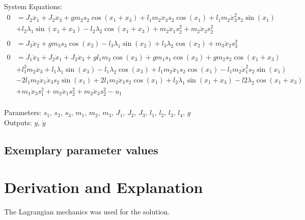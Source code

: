 \documentclass[10pt,a4paper]{article}
\begin{document}
	\noindent System Equations:			
	\begin{subequations}
	\begin{align*}
	0 &= J_2\ddot{x}_1 + J_2\ddot{x}_3 + g m_2 s_2\cos(x_1 + x_3) + l_1 m_2 \ddot{x}_3 s_2 \cos(x_1) + l_1 m_2 \dot{x}_3^2 s_2 \sin(x_1) \\
	&+ l_2 \lambda_1 \sin(x_1 + x_3) - l_2 \lambda_2 \cos(x_1 + x_3) + m_2 \ddot{x}_1 s_2^2 + m_2 \ddot{x}_3 s_2^2 \\ 
	\\
	0 &= J_3 \ddot{x}_2 + g m_3 s_3 \cos(x_2) - l_3 \lambda_1 \sin(x_2) + l_3 \lambda_2 \cos(x_2) + m_3 \ddot{x}_2 s_3^2 \\
	\\
	0 &= J_1 \ddot{x}_3 + J_2 \ddot{x}_1 + J_2 \ddot{x}_3 + g l_1 m_2 \cos(x_3) + g m_1 s_1 \cos(x_3) + g m_2 s_2 \cos(x_1 + x_3) \\
	&+ l_1^2 m_2 \ddot{x}_3 + l_1 \lambda_1 \sin(x_3) - l_1 \lambda_2 \cos(x_3) + l_1 m_2 \ddot{x}_1 s_2 \cos(x_1)- l_1 m_2 \dot{x}_1^2 s_2 \sin(x_1) \\
	&- 2 l_1 m_2 \dot{x}_1 \dot{x}_3 s_2 \sin(x_1) + 2 l_1 m_2 \ddot{x}_3 s_2 \cos(x_1)+ l_2 \lambda_1 \sin(x_1 + x_3) - l2 \lambda_2 \cos(x_1 + x_3) \\
	&+ m_1 \ddot{x}_3 s_1^2 + m_2 \ddot{x}_1 s_2^2 + m_2 \ddot{x}_3 s_2^2 - u_1 \\
	\end{align*}       
	\end{subequations}

	\noindent
	Parameters: $s_1, \, s_2, \, s_3, \, m_1, \, m_2, \, m_3, \, J_1, \, J_2, \, J_3, \, l_1, \, l_2, \, l_3, \, l_4, \, g$%
	\\
	Outputs: $y, \, \dot{y}$ %
	
	
	
	
	\subsection{Exemplary parameter values}
	

	
	\section{Derivation and Explanation} %
	The Lagrangian mechanics was used for the solution.
	
\end{document}

